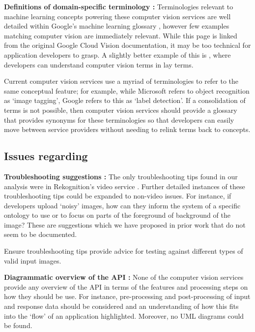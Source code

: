 \noindent
\textbf{Definitions of domain-specific terminology :}  Terminologies relevant to machine learning concepts powering these computer vision services are well detailed within Google's machine learning glossary , however few examples matching computer vision are immediately relevant. While this page is linked from the original Google Cloud Vision documentation, it may be too technical for application developers to grasp. A slightly better example of this is , where developers can understand computer vision terms in lay terms.

\begin{leftbar}\SuggestedImprovement
Current computer vision services use a myriad of terminologies to refer to the same conceptual feature; for example, while Microsoft refers to object recognition as `image tagging', Google refers to this as `label detection'. If a consolidation of terms is not possible, then computer vision services should provide a glossary that provides synonyms for these terminologies so that developers can easily move between service providers without needing to relink terms back to concepts.
\end{leftbar}

\subsection[Dimension D Issues]{Issues regarding \dimd{}}

\textbf{Troubleshooting suggestions :} The only troubleshooting tips found in our analysis were in Rekognition's video service . Further detailed instances of these troubleshooting tips could be expanded to non-video issues. For instance, if developers upload `noisy' images, how can they inform the system of a specific ontology to use or to focus on parts of the foreground of background of the image? These are suggestions which we have proposed in prior work \citep{Cummaudo:2019icsme} that do not seem to be documented.

\begin{leftbar}\SuggestedImprovement
Ensure troubleshooting tips provide advice for testing against different types of valid input images.   
\end{leftbar}

\noindent
\textbf{Diagrammatic overview of the API :} None of the computer vision services provide any overview of the API in terms of the features and processing steps on how they should be use. For instance, pre-processing and post-processing of input and response data should be considered and an understanding of how this fits into the `flow' of an application highlighted. Moreover, no UML diagrams could be found.

